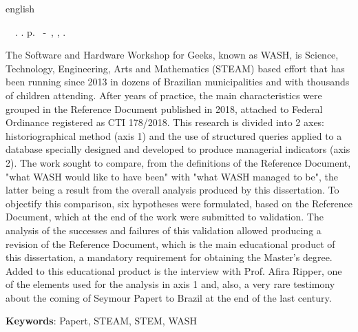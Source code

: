\begin{resumo}[Abstract]
 \begin{otherlanguage*}{english}
	\begin{flushleft} 
		\setlength{\absparsep}{0pt} %
 		\SingleSpacing  		\imprimirautorabr~~\textbf{\imprimirtitleabstract}.	\imprimirdata.  \pageref{LastPage}p. 
		\imprimirtipotrabalhoabs~-~\imprimirinstituicao, \imprimirlocal, 	\imprimirdata. 
 	\end{flushleft}
	\OnehalfSpacing 
The Software and Hardware Workshop for Geeks, known as WASH, is Science, Technology, Engineering, Arts and Mathematics (STEAM) based effort that has been running since 2013 in dozens of Brazilian municipalities and with thousands of children attending. After years of practice, the main characteristics were grouped in the Reference Document published in 2018, attached to Federal Ordinance registered as CTI 178/2018. This research is divided into 2 axes: historiographical method (axis 1) and the use of structured queries applied to a database specially designed and developed to produce managerial indicators (axis 2). The work sought to compare, from the definitions of the Reference Document, "what WASH would like to have been" with "what WASH managed to be", the latter being a result from the overall analysis produced by this dissertation. To objectify this comparison, six hypotheses were formulated, based on the Reference Document, which at the end of the work were submitted to validation. The analysis of the successes and failures of this validation allowed producing a revision of the Reference Document, which is the main educational product of this dissertation, a mandatory requirement for obtaining the Master's degree. Added to this educational product is the interview with Prof. Afira Ripper, one of the elements used for the analysis in axis 1 and, also, a very rare testimony about the coming of Seymour Papert to Brazil at the end of the last century.


   \vspace{\onelineskip}
 
   \noindent 
   \textbf{Keywords}: Papert, STEAM, STEM, WASH 
 \end{otherlanguage*}
\end{resumo}
